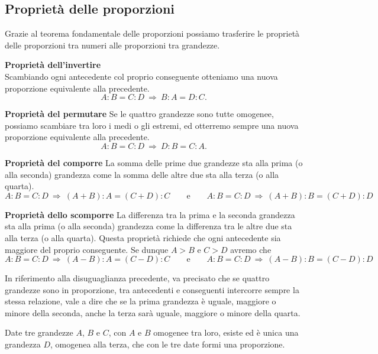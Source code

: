 \subsection{Proprietà delle proporzioni}

Grazie al teorema fondamentale delle proporzioni possiamo trasferire le proprietà delle proporzioni tra numeri alle proporzioni tra grandezze.

\begin{enumerate*}
\item \textbf{Proprietà dell'invertire}\\
Scambiando ogni antecedente col proprio conseguente otteniamo una nuova proporzione equivalente alla precedente.
\[A : B = C : D \:\Rightarrow\: B : A = D : C.\]

\item \textbf{Proprietà del permutare}
Se le quattro grandezze sono tutte omogenee, possiamo scambiare tra loro i medi o gli estremi, ed otterremo sempre una nuova proporzione equivalente alla precedente.
\[A : B = C : D \:\Rightarrow\: D : B = C : A.\]

\item \textbf{Proprietà del comporre}
La somma delle prime due grandezze sta alla prima (o alla seconda) grandezza come la somma delle altre due sta alla terza (o alla quarta).
\[A : B = C : D \:\Rightarrow\: (A + B) : A = (C + D) : C\qquad\text{e}\qquad A : B = C : D \:\Rightarrow\: (A + B) : B = (C + D) : D\]

\item \textbf{Proprietà dello scomporre}
La differenza tra la prima e la seconda grandezza sta alla prima (o alla seconda) grandezza come la differenza tra le altre due sta alla terza (o alla quarta). Questa proprietà richiede che ogni antecedente sia  maggiore del proprio conseguente. Se dunque $A > B$ e $C > D$ avremo che
\[A : B = C : D \:\Rightarrow\: (A - B) : A = (C - D) : C\qquad\text{e}\qquad A : B = C : D \:\Rightarrow\: (A - B) : B = (C - D) : D\]
\end{enumerate*}

In riferimento alla disuguaglianza precedente, va precisato che se quattro grandezze sono in proporzione, tra antecedenti e conseguenti intercorre sempre la stessa relazione, vale a dire che se la prima grandezza è uguale, maggiore o minore della seconda, anche la terza sarà uguale, maggiore o minore della quarta.

\begin{teorema}
Date tre grandezze $A$, $B$ e $C$, con $A$ e $B$ omogenee tra loro, esiste ed è unica una grandezza $D$, omogenea alla terza, che con le tre date formi una proporzione.
\end{teorema}

